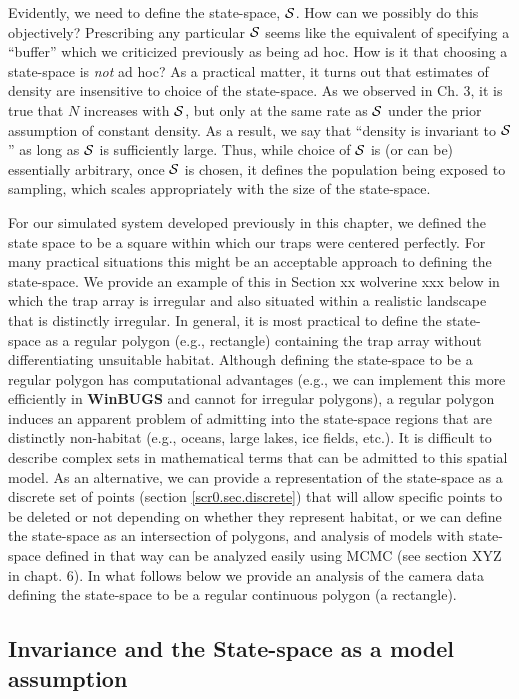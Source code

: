 Evidently, we need to define the state-space, ${\cal S}$. How can we possibly
do this objectively? Prescribing any particular ${\cal S}$ seems like the
equivalent of specifying a ``buffer'' which we criticized previously
as being ad hoc. How is it that choosing a state-space is {\it not} ad
hoc? As a practical matter, it turns out that estimates of density are
insensitive to choice of the state-space. As we observed in Ch. 3, 
it is true that $N$ increases with ${\cal S}$, but only at the same
rate as ${\cal S}$
under the prior assumption of constant density. As a result, we say
that ``density is invariant to ${\cal S}$'' as long as ${\cal S}$ is sufficiently
large. Thus, while choice of ${\cal S}$ is (or can be) essentially arbitrary,
once ${\cal S}$ is chosen, it defines the population being exposed to sampling,
which scales appropriately with the size of the state-space.

For our simulated system developed previously in this chapter, we
defined the state space to be a square within which our traps were
centered perfectly. For many practical situations this might be an
acceptable approach to defining the state-space. We provide an example
of this in Section xx wolverine xxx below in which the trap array is
irregular and also situated within a realistic landscape that is
distinctly irregular.  In general, it is most practical to define the
state-space as a regular polygon (e.g., rectangle) containing the trap
array without differentiating unsuitable habitat. Although defining
the state-space to be a regular polygon has computational advantages
(e.g., we can implement this more efficiently in {\bf WinBUGS} and
cannot for irregular polygons), a regular polygon induces an apparent
problem of admitting into the state-space regions that are distinctly
non-habitat (e.g., oceans, large lakes, ice fields, etc.).  It is
difficult to describe complex sets in mathematical terms that can be
admitted to this spatial model. As an alternative, we can provide a
representation of the state-space as a discrete set of points (section
\ref{scr0.sec.discrete}) that will allow specific points to be deleted
or not depending on whether they represent habitat, or we can define
the state-space as an intersection of polygons, and analysis of models
with state-space defined in that way can be analyzed easily using MCMC
(see section XYZ in chapt. 6).  In what follows below we provide an
analysis of the camera data defining the state-space to be a regular
continuous polygon (a rectangle).


\subsection{Invariance and the State-space as a model assumption}

